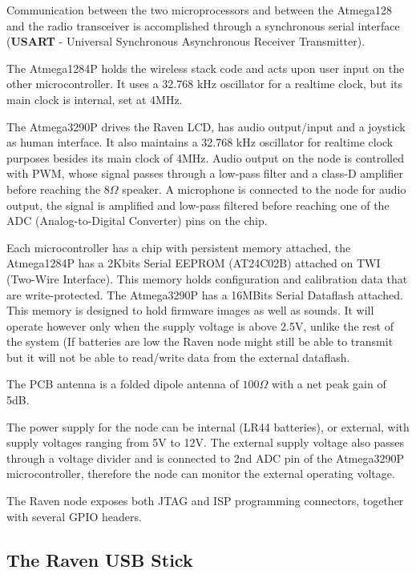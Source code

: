 Communication between the two microprocessors and between the Atmega128 and the radio transceiver is accomplished through a synchronous serial
interface (\textbf{USART} - Universal Synchronous Asynchronous Receiver Transmitter).

The Atmega1284P holds the wireless stack code and acts upon user input on the other microcontroller. It uses a  32.768 kHz oscillator for a realtime
clock, but its main clock is internal, set at 4MHz.

The Atmega3290P drives the Raven LCD, has audio output/input and a joystick as human interface. It also maintains a 32.768 kHz oscillator for realtime 
clock purposes besides its main clock of 4MHz. Audio output on the node is controlled with PWM, whose signal passes through a low-pass filter and a 
class-D amplifier before reaching the 8$\Omega$ speaker. A microphone is connected to the node for audio output, the signal is amplified and low-pass 
filtered before reaching one of the ADC (Analog-to-Digital Converter) pins on the chip.  

Each microcontroller has a chip with persistent memory attached, the Atmega1284P has a 2Kbits Serial EEPROM (AT24C02B) attached on TWI (Two-Wire
Interface). This memory holds configuration and calibration data that are write-protected. The Atmega3290P has a 16MBits Serial Dataflash attached. 
This memory is designed to hold firmware images as well as sounds. It will operate however only when the supply voltage is above 2.5V, unlike the rest
of the system (If batteries are low the Raven node might still be able to transmit but it will not be able to read/write data from the external dataflash.

The PCB antenna is a folded dipole antenna of $100\Omega$ with a net peak gain of 5dB.

The power supply for the node can be internal (LR44 batteries), or external, with supply voltages ranging from 5V to 12V. The external supply voltage
also passes through a voltage divider and is connected to 2nd ADC pin of the Atmega3290P microcontroller, therefore the node can monitor the external
operating voltage.

The Raven node exposes both JTAG and ISP programming connectors, together with several GPIO headers.

\subsection{The Raven USB Stick}


